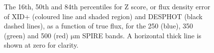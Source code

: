 \documentclass[useAMS,usenatbib]{mnras}
\begin{document}
\begin{figure}
\centering 
\caption{The 16th, 50th and 84th percentiles for Z score, or flux density error of \textsc{XID+} (coloured line and shaded region) and \textsc{DESPHOT}  (black dashed lines), as a function of true flux, for the 250 (blue), 350 (green) and 500 (red) $\mathrm{\mu m}$ SPIRE bands. A horizontal thick line is shown at zero for clarity.}\label{fig:zscore}
\end{figure}
\end{document}
